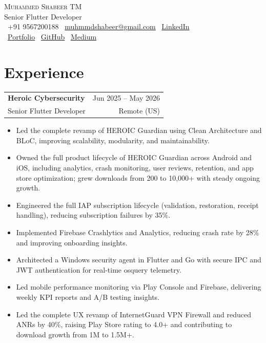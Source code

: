 \documentclass[letterpaper,10pt]{article}
\makeatletter
\newcommand{\role}[4]{
  \vspace{2pt}
  \noindent\begin{tabular*}{\textwidth}{l@{\extracolsep{\fill}}r}
    \textbf{#1} & #2 \\
    #3 & #4 \\
  \end{tabular*}
  \vspace{-6pt}
}
\makeatother
\begin{document}
\mbox{}\vspace{15pt}

\begin{center}
    {\Huge \scshape Muhammed Shabeer TM}\\[4pt]
    {\small Senior Flutter Developer}\\[6pt]
    {\small
    \faPhone*\ +91 9567200188 \quad
    \faEnvelope\ \href{mailto:muhmmdshabeer@gmail.com}{muhmmdshabeer@gmail.com} \quad
    \faLinkedin\ \href{https://linkedin.com/in/muhammed-shabeer-tm-55271018b}{LinkedIn}\\[2pt]
    \faGlobe\ \href{https://shabeer.pages.dev}{Portfolio} \quad
    \faGithub\ \href{https://github.com/meahdev}{GitHub} \quad
    \faMedium\ \href{https://medium.com/@muhmmdshabeer}{Medium}
    }
\end{center}

\vspace{-4pt}

\section*{Experience}

\role{Heroic Cybersecurity}{Jun 2025 -- May 2026}{Senior Flutter Developer}{Remote (US)}
\begin{itemize}
  \item Led the complete revamp of HEROIC Guardian using Clean Architecture and BLoC, improving scalability, modularity, and maintainability.
  \item Owned the full product lifecycle of HEROIC Guardian across Android and iOS, including analytics, crash monitoring, user reviews, retention, and app store optimization; grew downloads from 200 to 10,000+ with steady ongoing growth.
  \item Engineered the full IAP subscription lifecycle (validation, restoration, receipt handling), reducing subscription failures by 35\%.
  \item Implemented Firebase Crashlytics and Analytics, reducing crash rate by 28\% and improving onboarding insights.
  \item Architected a Windows security agent in Flutter and Go with secure IPC and JWT authentication for real-time osquery telemetry.
  \item Led mobile performance monitoring via Play Console and Firebase, delivering weekly KPI reports and A/B testing insights.
  \item Led the complete UX revamp of InternetGuard VPN Firewall and reduced ANRs by 40\%, raising Play Store rating to 4.0+ and contributing to download growth from 1M to 1.5M+.
\end{itemize}
\end{document}
